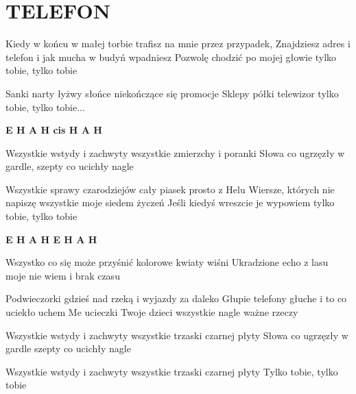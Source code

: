 \documentclass[../../../songbook.tex]{subfiles}
\begin{document}
\TabPositions{10cm} %
\section*{TELEFON}
{}
\vspace{0.5cm}
Kiedy w końcu w małej torbie trafisz na mnie przez przypadek,	 \newline
Znajdziesz adres i telefon i jak mucha w budyń wpadniesz			 \newline
Pozwolę chodzić po mojej głowie tylko tobie, tylko tobie 			 \newline

Sanki narty łyżwy słońce niekończące się promocje			 \newline
Sklepy półki telewizor tylko tobie, tylko tobie...			 \newline

{\color{red}\textbf{E H A H cis H A H} } \newline

Wszystkie wstydy i zachwyty wszystkie zmierzchy i poranki		 \newline
Słowa co ugrzęzły w gardle, szepty co ucichły nagle 		 \newline

Wszystkie sprawy czarodziejów cały piasek prosto z Helu			 \newline
Wiersze, których nie napiszę wszystkie moje siedem życzeń			 \newline
Jeśli kiedyś wreszcie je wypowiem tylko tobie, tylko tobie 			 \newline

{\color{red}\textbf{E H A H E H A H} } \newline

Wszystko co się może przyśnić kolorowe kwiaty wiśni 	 \newline
Ukradzione echo z lasu moje nie wiem i brak czasu			 \newline

Podwieczorki gdzieś nad rzeką i wyjazdy za daleko			 \newline
Głupie telefony głuche i to co uciekło uchem			 \newline
Me ucieczki Twoje dzieci wszystkie nagle ważne rzeczy			 \newline

Wszystkie wstydy i zachwyty wszystkie trzaski czarnej płyty			 \newline
Słowa co ugrzęzły w gardle szepty co ucichły nagle			 \newline

Wszystkie wstydy i zachwyty wszystkie trzaski czarnej płyty			 \newline
Tylko tobie, tylko tobie 			 \newline
\end{document}
